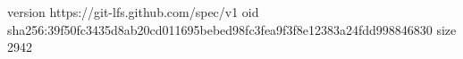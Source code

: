 version https://git-lfs.github.com/spec/v1
oid sha256:39f50fc3435d8ab20cd011695bebed98fc3fea9f3f8e12383a24fdd998846830
size 2942
